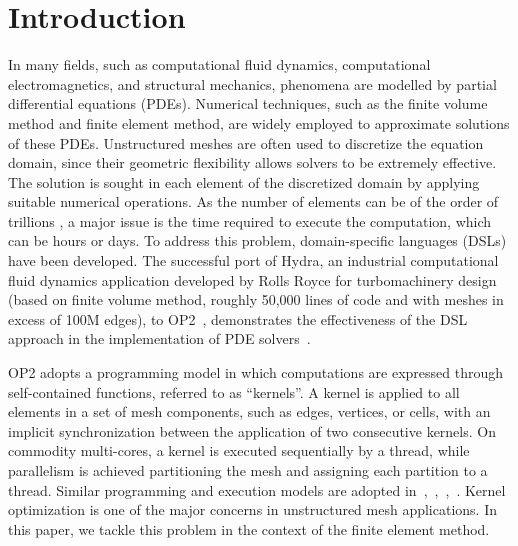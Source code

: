 \documentclass[conference]{IEEEtran}
\begin{document}
\section{Introduction}
In many fields, such as computational fluid dynamics, computational electromagnetics, and structural mechanics, phenomena are modelled by partial differential equations (PDEs). Numerical techniques, such as the finite volume method and finite element method, are widely employed to approximate solutions of these PDEs. Unstructured meshes are often used to discretize the equation domain, since their geometric flexibility allows solvers to be extremely effective. The solution is sought in each element of the discretized domain by applying suitable numerical operations. As the number of elements can be of the order of trillions \cite{Rossinelli2013}, a major issue is the time required to execute the computation, which can be hours or days. To address this problem, domain-specific languages (DSLs) have been developed. The successful port of Hydra, an industrial computational fluid dynamics application developed by Rolls Royce for turbomachinery design (based on finite volume method, roughly 50,000 lines of code and with meshes in excess of 100M edges), to OP2~\cite{op2-main}, demonstrates the effectiveness of the DSL approach in the implementation of PDE solvers~\cite{IstvanHydra}.

OP2 adopts a programming model in which computations are expressed through self-contained functions, referred to as ``kernels''. A kernel is applied to all elements in a set of mesh components, such as edges, vertices, or cells, with an implicit synchronization between the application of two consecutive kernels. On commodity multi-cores, a kernel is executed sequentially by a thread, while parallelism is achieved partitioning the mesh and assigning each partition to a thread. Similar programming and execution models are adopted in~\cite{pyop2isc},~\cite{Fenics},~\cite{fluidity_manual_v4},~\cite{lizst}. Kernel optimization is one of the major concerns in unstructured mesh applications. In this paper, we tackle this problem in the context of the finite element method.
\end{document}
